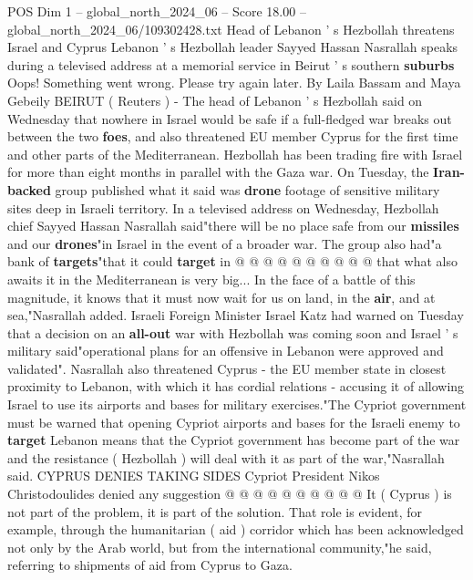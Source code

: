 \begin{textsample}{POS Dim 1 – global\_north\_2024\_06 – Score 18.00 – global\_north\_2024\_06/109302428.txt}  \label{ex:f1_pos_317}
Head of Lebanon ' s Hezbollah threatens Israel and Cyprus Lebanon ' s Hezbollah leader Sayyed Hassan Nasrallah speaks during a televised address at a memorial service in Beirut ' s southern \textbf{suburbs} Oops!
Something went wrong.
Please try again later.
By Laila Bassam and Maya Gebeily BEIRUT ( Reuters ) - The head of Lebanon ' s Hezbollah said on Wednesday that nowhere in Israel would be safe if a full-fledged war breaks out between the two \textbf{foes}, and also threatened EU member Cyprus for the first time and other parts of the Mediterranean.
Hezbollah has been trading fire with Israel for more than eight months in parallel with the Gaza war.
On Tuesday, the \textbf{Iran-backed} group published what it said was \textbf{drone} footage of sensitive military sites deep in Israeli territory.
In a televised address on Wednesday, Hezbollah chief Sayyed Hassan Nasrallah said"there will be no place safe from our \textbf{missiles} and our \textbf{drones}"in Israel in the event of a broader war.
The group also had"a bank of \textbf{targets}"that it could \textbf{target} in @ @ @ @ @ @ @ @ @ @ that what also awaits it in the Mediterranean is very big...
In the face of a battle of this magnitude, it knows that it must now wait for us on land, in the \textbf{air}, and at sea,"Nasrallah added.
Israeli Foreign Minister Israel Katz had warned on Tuesday that a decision on an \textbf{all-out} war with Hezbollah was coming soon and Israel ' s military said"operational plans for an offensive in Lebanon were approved and validated".
Nasrallah also threatened Cyprus - the EU member state in closest proximity to Lebanon, with which it has cordial relations - accusing it of allowing Israel to use its airports and bases for military exercises."The Cypriot government must be warned that opening Cypriot airports and bases for the Israeli enemy to \textbf{target} Lebanon means that the Cypriot government has become part of the war and the resistance ( Hezbollah ) will deal with it as part of the war,"Nasrallah said.
CYPRUS DENIES TAKING SIDES Cypriot President Nikos Christodoulides denied any suggestion @ @ @ @ @ @ @ @ @ @ It ( Cyprus ) is not part of the problem, it is part of the solution.
That role is evident, for example, through the humanitarian ( aid ) corridor which has been acknowledged not only by the Arab world, but from the international community,"he said, referring to shipments of aid from Cyprus to Gaza.

\end{textsample}
